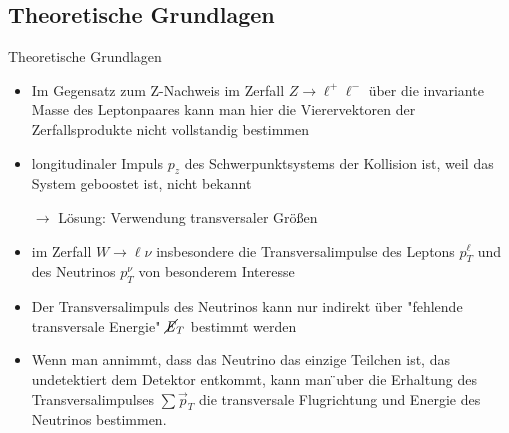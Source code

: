 \documentclass[aspectratio=1610, 9pt]{beamer}
\begin{document}
\subsection{Theoretische Grundlagen}
\begin{frame}{Theoretische Grundlagen}
   \begin{itemize}
     \item Im Gegensatz zum Z-Nachweis im Zerfall $Z \rightarrow \ell^+ \ell^-$ über die invariante Masse des Leptonpaares kann man hier die Vierervektoren der Zerfallsprodukte nicht vollstandig bestimmen
     \item longitudinaler Impuls $p_z$ des Schwerpunktsystems der Kollision ist, weil das System geboostet ist, nicht bekannt \\
     \item[$\longrightarrow$] Lösung: Verwendung transversaler Größen
   \end{itemize}
\end{frame}

\begin{frame}
  \begin{itemize}
    \item im Zerfall $W \rightarrow \ell \nu$ insbesondere die Transversalimpulse des Leptons $p^\ell_T$ und des Neutrinos $p^\nu_T$ von besonderem Interesse
    \item Der Transversalimpuls des Neutrinos kann nur indirekt über "fehlende transversale Energie"  $\cancel{\it{E}}_{T}$ bestimmt werden
    \item Wenn man annimmt, dass das Neutrino das einzige Teilchen ist, das undetektiert dem Detektor entkommt, kann man ̈uber die Erhaltung des Transversalimpulses $\sum \vec{p}_T$ die transversale Flugrichtung und Energie des Neutrinos bestimmen.
  \end{itemize}
\end{frame}
\end{document}
